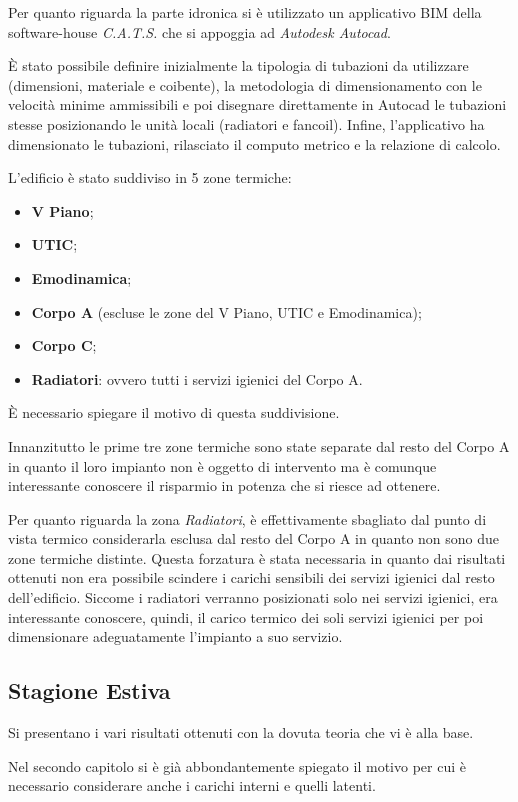 Per quanto riguarda la parte idronica si è utilizzato un applicativo BIM della software-house \emph{C.A.T.S.} che si appoggia ad \emph{Autodesk Autocad}.

È stato possibile definire inizialmente la tipologia di tubazioni da utilizzare (dimensioni, materiale e coibente), la metodologia di dimensionamento con le velocità minime ammissibili e poi disegnare direttamente in Autocad le tubazioni stesse posizionando le unità locali (radiatori e fancoil). Infine, l'applicativo ha dimensionato le tubazioni, rilasciato il computo metrico e la relazione di calcolo.

L'edificio è stato suddiviso in 5 zone termiche:
\begin{itemize}
	\item \textbf{V Piano};
	\item \textbf{UTIC};
	\item \textbf{Emodinamica};
	\item \textbf{Corpo A} (escluse le zone del V Piano, UTIC e Emodinamica);
	\item \textbf{Corpo C};
	\item \textbf{Radiatori}: ovvero tutti i servizi igienici del Corpo A. 
\end{itemize}
È necessario spiegare il motivo di questa suddivisione.

Innanzitutto le prime tre zone termiche sono state separate dal resto del Corpo A in quanto il loro impianto non è oggetto di intervento ma è comunque interessante conoscere il risparmio in potenza che si riesce ad ottenere.

Per quanto riguarda la zona \emph{Radiatori}, è effettivamente sbagliato dal punto di vista termico considerarla esclusa dal resto del Corpo A in quanto non sono due zone termiche distinte. Questa forzatura è stata necessaria in quanto dai risultati ottenuti non era possibile scindere i carichi sensibili dei servizi igienici dal resto dell'edificio. Siccome i radiatori verranno posizionati solo nei servizi igienici, era interessante conoscere, quindi, il carico termico dei soli servizi igienici per poi dimensionare adeguatamente l'impianto a suo servizio. 

\subsection{Stagione Estiva}
Si presentano i vari risultati ottenuti con la dovuta teoria che vi è alla base.

Nel secondo capitolo si è già abbondantemente spiegato il motivo per cui è necessario considerare anche i carichi interni e quelli latenti.

